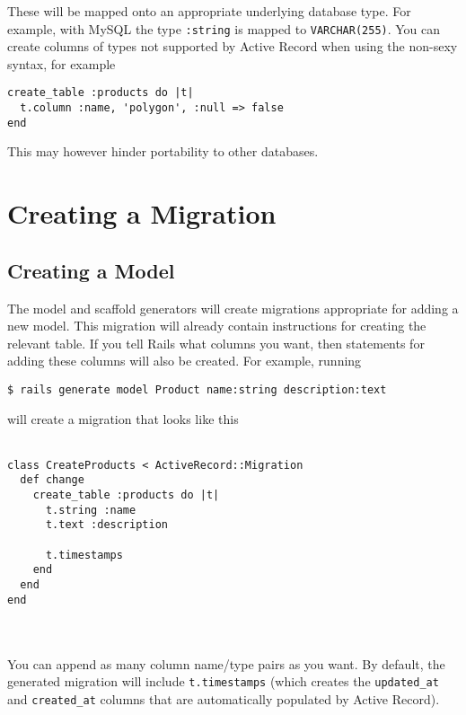 \documentclass[10pt]{book}
\begin{document}
These will be mapped onto an appropriate underlying database type. For example, with MySQL the type \texttt{:string} is mapped to \texttt{VARCHAR(255)}. You can create columns of types not supported by Active Record when using the non-sexy syntax, for example
\begin{verbatim}
create_table :products do |t|
  t.column :name, 'polygon', :null => false
end
\end{verbatim}


This may however hinder portability to other databases.

\section{ Creating a Migration}

\subsection{ Creating a Model}

The model and scaffold generators will create migrations appropriate for adding a new model. This migration will already contain instructions for creating the relevant table. If you tell Rails what columns you want, then statements for adding these columns will also be created. For example, running

\begin{verbatim}
$ rails generate model Product name:string description:text
\end{verbatim}


will create a migration that looks like this
\\ \\
\begin{minipage}{\textwidth}
\begin{verbatim}
class CreateProducts < ActiveRecord::Migration
  def change
    create_table :products do |t|
      t.string :name
      t.text :description
 
      t.timestamps
    end
  end
end
\end{verbatim}
\end{minipage}
\\ \\


You can append as many column name/type pairs as you want. By default, the generated migration will include \texttt{t.timestamps} (which creates the \texttt{updated\_at} and \texttt{created\_at} columns that are automatically populated by Active Record).
\end{document}

